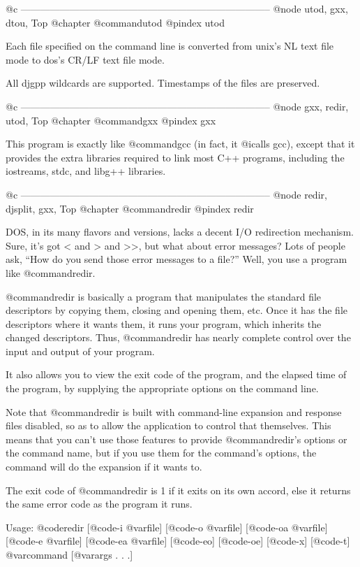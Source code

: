@c -----------------------------------------------------------------------------
@node utod, gxx, dtou, Top
@chapter @command{utod}
@pindex utod

Each file specified on the command line is converted from unix's NL text
file mode to dos's CR/LF text file mode.

All djgpp wildcards are supported.  Timestamps of the files are preserved.

@c -----------------------------------------------------------------------------
@node gxx, redir, utod, Top
@chapter @command{gxx}
@pindex gxx

This program is exactly like @command{gcc} (in fact, it @i{calls} gcc), except
that it provides the extra libraries required to link most C++ programs,
including the iostreams, stdc, and libg++ libraries.

@c -----------------------------------------------------------------------------
@node    redir, djsplit, gxx, Top
@chapter @command{redir}
@pindex redir

DOS, in its many flavors and versions, lacks a decent I/O redirection
mechanism.  Sure, it's got < and > and >>, but what about error
messages?  Lots of people ask, ``How do you send those error messages
to a file?''  Well, you use a program like @command{redir}.

@command{redir} is basically a program that manipulates the standard file
descriptors by copying them, closing and opening them, etc.  Once it
has the file descriptors where it wants them, it runs your program,
which inherits the changed descriptors.  Thus, @command{redir} has nearly
complete control over the input and output of your program.

It also allows you to view the exit code of the program, and the
elapsed time of the program, by supplying the appropriate options on
the command line.

Note that @command{redir} is built with command-line expansion and response files
disabled, so as to allow the application to control that themselves.
This means that you can't use those features to provide @command{redir}'s options
or the command name, but if you use them for the command's options, the
command will do the expansion if it wants to.

The exit code of @command{redir} is 1 if it exits on its own accord, else it
returns the same error code as the program it runs.

Usage: @code{redir} [@code{-i} @var{file}] [@code{-o} @var{file}]
[@code{-oa} @var{file}] [@code{-e} @var{file}] [@code{-ea} @var{file}]
[@code{-eo}] [@code{-oe}] [@code{-x}] [@code{-t}] @var{command}
[@var{args} . . .]

